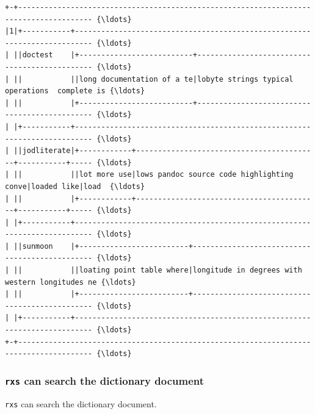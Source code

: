 \documentclass[11pt,letter,landscape]{article}
\begin{document}
    \begin{Verbatim}[commandchars=\\\{\}]
+-+--------------------------------------------------------------------------------------- {\ldots} 
|1|+-----------+-------------------------------------------------------------------------- {\ldots} 
| ||doctest    |+--------------------------+---------------------------------------------- {\ldots} 
| ||           ||long documentation of a te|lobyte strings typical operations  complete is {\ldots} 
| ||           |+--------------------------+---------------------------------------------- {\ldots} 
| |+-----------+-------------------------------------------------------------------------- {\ldots} 
| ||jodliterate|+------------+------------------------------------------+-----------+----- {\ldots} 
| ||           ||lot more use|lows pandoc source code highlighting conve|loaded like|load  {\ldots} 
| ||           |+------------+------------------------------------------+-----------+----- {\ldots} 
| |+-----------+-------------------------------------------------------------------------- {\ldots} 
| ||sunmoon    |+-------------------------+----------------------------------------------- {\ldots} 
| ||           ||loating point table where|longitude in degrees with western longitudes ne {\ldots} 
| ||           |+-------------------------+----------------------------------------------- {\ldots} 
| |+-----------+-------------------------------------------------------------------------- {\ldots} 
+-+--------------------------------------------------------------------------------------- {\ldots} 

    \end{Verbatim}

    \subsubsection{\texorpdfstring{\texttt{rxs} can search the dictionary
document}{rxs can search the dictionary document}}\label{rxs-can-search-the-dictionary-document}

\texttt{rxs} can search the dictionary document.
\end{document}
